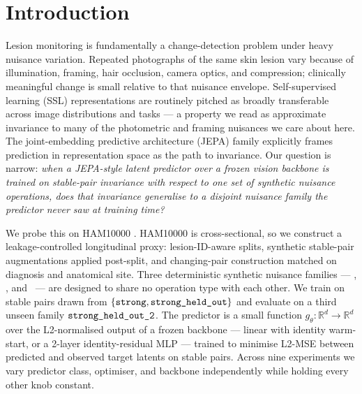 \section{Introduction}
\label{sec:introduction}

Lesion monitoring is fundamentally a change-detection problem under heavy
nuisance variation. Repeated photographs of the same skin lesion vary because
of illumination, framing, hair occlusion, camera optics, and compression;
clinically meaningful change is small relative to that nuisance envelope.
Self-supervised learning (SSL) representations are routinely pitched as
broadly transferable across image distributions and tasks
\citep{caron2021dino, oquab2024dinov2, radford2021clip} --- a property
we read as approximate invariance to many of the
photometric and framing nuisances we care about here. The
joint-embedding predictive architecture (JEPA) family
\citep{lecun2022path, assran2023ijepa} explicitly frames prediction in
representation space as the path to invariance. Our question is narrow:
\emph{when a JEPA-style latent predictor over a frozen vision backbone is
trained on stable-pair invariance with respect to one set of synthetic nuisance
operations, does that invariance generalise to a disjoint nuisance family the
predictor never saw at training time?}

We probe this on HAM10000 \citep{tschandl2018ham10000}. HAM10000 is
cross-sectional, so we construct a leakage-controlled longitudinal proxy:
lesion-ID-aware splits, synthetic stable-pair augmentations applied
post-split, and changing-pair construction matched on diagnosis and anatomical
site. Three deterministic synthetic nuisance families --- \strongfam,
\strongholdone, and \strongholdtwo\ --- are designed to share no operation
type with each other. We train on stable pairs drawn from $\{\texttt{strong},
\texttt{strong\_held\_out}\}$ and evaluate on a third unseen family $\texttt{strong\_held\_out\_2}$. The
predictor is a small function $g_\theta : \mathbb{R}^d \to \mathbb{R}^d$ over
the L2-normalised output of a frozen backbone --- linear with identity
warm-start, or a 2-layer identity-residual MLP --- trained to minimise L2-MSE
between predicted and observed target latents on stable pairs. Across nine
experiments we vary predictor class, optimiser, and backbone independently
while holding every other knob constant.

